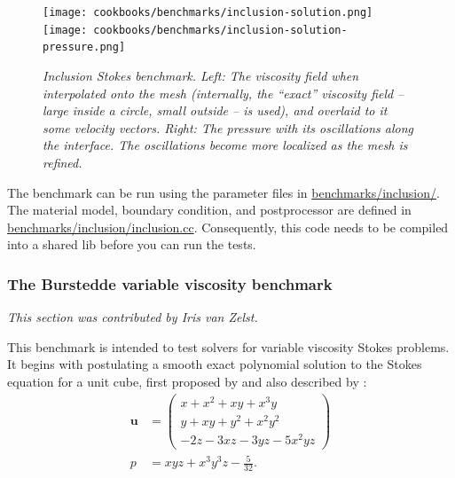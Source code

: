 \documentclass{article}
\begin{document}
\begin{figure}
  \begin{center}
    \texttt{[image: cookbooks/benchmarks/inclusion-solution.png]}
    \hfill
    \texttt{[image: cookbooks/benchmarks/inclusion-solution-pressure.png]}
    \caption{\it Inclusion Stokes benchmark. Left: The viscosity field
      when interpolated onto the mesh (internally, the ``exact'' viscosity
      field -- large inside a circle, small outside -- is used),
      and overlaid to it some velocity vectors. Right: The
      pressure with its oscillations along the interface. The oscillations
      become more localized as the mesh is refined.}
    \label{fig:inclusion}
  \end{center}
\end{figure}

The benchmark can be run using the parameter files in \url{benchmarks/inclusion/}. The material model, boundary condition, and postprocessor are defined in \url{benchmarks/inclusion/inclusion.cc}. Consequently, this code needs to be compiled into a shared lib before you can run the tests.







\subsubsection{The Burstedde variable viscosity benchmark}
\label{sec:benchmark-burstedde}

\textit{This section was contributed by Iris van Zelst.}

This benchmark is intended to test solvers for variable viscosity Stokes
problems. It begins with postulating a smooth exact polynomial solution to the Stokes equation for a unit cube, first proposed by \cite{dobo04} and also described by \cite{busa13}:
\begin{align}
  {\mathbf u} &= \left( \begin{array}{c}
      x+x^2+xy+x^3y \\
      y + xy + y^2 + x^2 y^2\\
      -2z - 3xz - 3yz - 5x^2 yz
    \end{array}
  \right)
  \label{eq:burstedde-velocity}
  \\
  p &= xyz + x^3 y^3z - \frac{5}{32}.
  \label{eq:burstedde-pressure}
\end{align}
\end{document}
